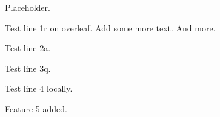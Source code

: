 

Placeholder.

Test line 1r on overleaf. Add some more text. And more.

Test line 2a.

Test line 3q.

Test line 4 locally.

Feature 5 added.

